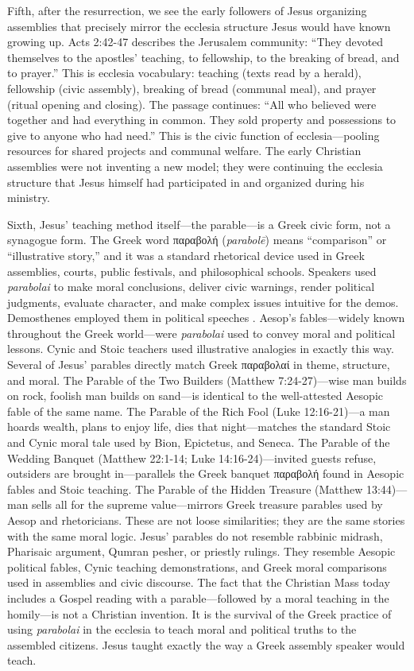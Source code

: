 Fifth, after the resurrection, we see the early followers of Jesus organizing assemblies that precisely mirror the ecclesia structure Jesus would have known growing up.
Acts 2:42-47 describes the Jerusalem community: ``They devoted themselves to the apostles' teaching, to fellowship, to the breaking of bread, and to prayer.''
This is ecclesia vocabulary: teaching (texts read by a herald), fellowship (civic assembly), breaking of bread (communal meal), and prayer (ritual opening and closing).
The passage continues: ``All who believed were together and had everything in common. They sold property and possessions to give to anyone who had need.''
This is the civic function of ecclesia---pooling resources for shared projects and communal welfare.
The early Christian assemblies were not inventing a new model; they were continuing the ecclesia structure that Jesus himself had participated in and organized during his ministry.

Sixth, Jesus' teaching method itself---the parable---is a Greek civic form, not a synagogue form.
The Greek word παραβολή (\emph{parabolē}) means ``comparison'' or ``illustrative story,'' and it was a standard rhetorical device used in Greek assemblies, courts, public festivals, and philosophical schools.
Speakers used \emph{parabolai} to make moral conclusions, deliver civic warnings, render political judgments, evaluate character, and make complex issues intuitive for the demos.
Demosthenes employed them in political speeches \cite[10]{demosthenes:olynthiac2} \cite[40]{demosthenes:philippic1}.
Aesop's fables---widely known throughout the Greek world---were \emph{parabolai} used to convey moral and political lessons.
Cynic and Stoic teachers used illustrative analogies in exactly this way.
Several of Jesus' parables directly match Greek παραβολαί in theme, structure, and moral.
The Parable of the Two Builders (Matthew 7:24-27)---wise man builds on rock, foolish man builds on sand---is identical to the well-attested Aesopic fable of the same name.
The Parable of the Rich Fool (Luke 12:16-21)---a man hoards wealth, plans to enjoy life, dies that night---matches the standard Stoic and Cynic moral tale used by Bion, Epictetus, and Seneca.
The Parable of the Wedding Banquet (Matthew 22:1-14; Luke 14:16-24)---invited guests refuse, outsiders are brought in---parallels the Greek banquet παραβολή found in Aesopic fables and Stoic teaching.
The Parable of the Hidden Treasure (Matthew 13:44)---man sells all for the supreme value---mirrors Greek treasure parables used by Aesop and rhetoricians.
These are not loose similarities; they are the same stories with the same moral logic.
Jesus' parables do not resemble rabbinic midrash, Pharisaic argument, Qumran pesher, or priestly rulings.
They resemble Aesopic political fables, Cynic teaching demonstrations, and Greek moral comparisons used in assemblies and civic discourse.
The fact that the Christian Mass today includes a Gospel reading with a parable---followed by a moral teaching in the homily---is not a Christian invention.
It is the survival of the Greek practice of using \emph{parabolai} in the ecclesia to teach moral and political truths to the assembled citizens.
Jesus taught exactly the way a Greek assembly speaker would teach.

